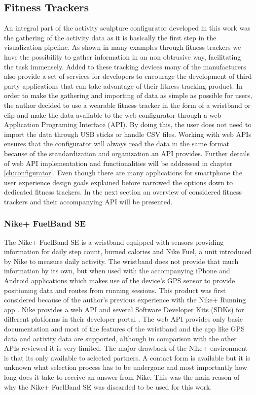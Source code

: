 \documentclass[../medieninformatik-arbeit.tex]{subfiles}
\begin{document}
\subsection{Fitness Trackers}
An integral part of the activity sculpture configurator developed in this work was the gathering of the activity data as it is basically the first step in the visualization pipeline. As shown in many examples \cite{khot2014understanding,swaminathan2014supporting,mental2014fabrications} through fitness trackers we have the possibility to gather information in an non obtrusive way, facilitating the task immensely. Added to these tracking devices many of the manufacturers also provide a set of services for developers to encourage the development of third party applications that can take advantage of their fitness tracking product. In order to make the gathering and importing of data as simple as possible for users, the author decided to use a wearable fitness tracker in the form of a wristband or clip and make the data available to the web configurator through a web Application Programing Interface (API). By doing this, the user does not need to import the data through USB sticks or handle CSV files. Working with web APIs ensures that the configurator will always read the data in the same format because of the standardization and organization an API provides. Further details of web API implementation and functionalities will be addressed in chapter \ref{ch:configurator}. Even though there are many applications for smartphone the user experience design goals explained before narrowed the options down to dedicated fitness trackers. In the next section an overview of considered fitness trackers and their accompanying API will be presented.

\subsubsection*{Nike+ FuelBand SE}
The Nike+ FuelBand SE \cite{nikePlusFuelBand} is a wristband equipped with sensors providing information for daily step count, burned calories and Nike Fuel, a unit introduced by Nike to measure daily activity. The wristband does not provide that much information by its own, but when used with the accompanying iPhone and Android applications which makes use of the device's GPS sensor to provide positioning data and routes from running sessions. This product was first considered because of the author's previous experience with the Nike+ Running app \cite{nikeRunningApp}. Nike provides a web API and several Software Developer Kits (SDKs) for different platforms in their developer portal \cite{nikeApi}. The web API provides only basic documentation and most of the features of the wristband and the app like GPS data and activity data are supported, although in comparison with the other APIs reviewed it is very limited. The major drawback of the Nike+ environment is that its only available to selected partners. A contact form is available but it is unknown what selection process has to be undergone and most importantly how long does it take to receive an answer from Nike. This was the main reason of why the Nike+ FuelBand SE was discarded to be used for this work.  
\end{document}
